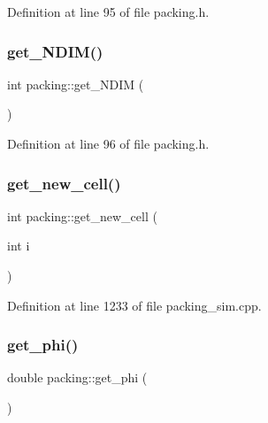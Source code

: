 Definition at line 95 of file packing.\+h.

\mbox{\label{classpacking_a09b1231993da19d68581f630365d0c3a}} 
\subsubsection{\texorpdfstring{get\+\_\+\+N\+D\+I\+M()}{get\_NDIM()}}
{\footnotesize\ttfamily int packing\+::get\+\_\+\+N\+D\+IM (\begin{DoxyParamCaption}{ }\end{DoxyParamCaption})\hspace{0.3cm}{\ttfamily [inline]}}



Definition at line 96 of file packing.\+h.

\mbox{\label{classpacking_ac1311816bef393e5fccbbf61acefcb89}} 
\subsubsection{\texorpdfstring{get\+\_\+new\+\_\+cell()}{get\_new\_cell()}}
{\footnotesize\ttfamily int packing\+::get\+\_\+new\+\_\+cell (\begin{DoxyParamCaption}\item[{int}]{i }\end{DoxyParamCaption})}



Definition at line 1233 of file packing\+\_\+sim.\+cpp.

\mbox{\label{classpacking_a08f9bf70b057ad530e1499c15fdb34ff}} 
\subsubsection{\texorpdfstring{get\+\_\+phi()}{get\_phi()}}
{\footnotesize\ttfamily double packing\+::get\+\_\+phi (\begin{DoxyParamCaption}{ }\end{DoxyParamCaption})\hspace{0.3cm}{\ttfamily [inline]}}



